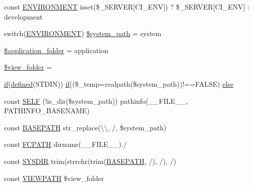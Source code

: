 \begin{DoxyCompactItemize}
\item 
const \hyperlink{index_8php_a8757a57d09df5349f8b93b2083e29a1e}{E\+N\+V\+I\+R\+O\+N\+M\+E\+N\+T} isset(\$\+\_\+\+S\+E\+R\+V\+E\+R\mbox{[}\textquotesingle{}C\+I\+\_\+\+E\+N\+V\textquotesingle{}\mbox{]}) ? \$\+\_\+\+S\+E\+R\+V\+E\+R\mbox{[}\textquotesingle{}C\+I\+\_\+\+E\+N\+V\textquotesingle{}\mbox{]} \+: \textquotesingle{}development\textquotesingle{}
\item 
switch(\hyperlink{index_8php_a8757a57d09df5349f8b93b2083e29a1e}{E\+N\+V\+I\+R\+O\+N\+M\+E\+N\+T}) \hyperlink{index_8php_af832b0c9a5014f0bb87496701ceb30e5}{\$system\+\_\+path} = \textquotesingle{}system\textquotesingle{}
\item 
\hyperlink{index_8php_ace4309eda0b92e3260b226079bc17909}{\$application\+\_\+folder} = \textquotesingle{}application\textquotesingle{}
\item 
\hyperlink{index_8php_a974fdae9fe36c7e07e82bb71ed42b6b3}{\$view\+\_\+folder} = \textquotesingle{}\textquotesingle{}
\item 
\hyperlink{excanvas_8js_a409038cddd5fb941140f7ff76f5b7b15}{if}(\hyperlink{_bootstrap_8php_a46458e8654a714e0565e20f63021add9}{defined}(\textquotesingle{}S\+T\+D\+I\+N\textquotesingle{})) \hyperlink{excanvas_8js_a409038cddd5fb941140f7ff76f5b7b15}{if}((\$\+\_\+temp=realpath(\$system\+\_\+path))!==F\+A\+L\+S\+E) \hyperlink{index_8php_afe05baa2384a370483088b4c250fcd90}{else}
\item 
const \hyperlink{index_8php_a428c045e64680e1582ba74161e441a1c}{S\+E\+L\+F} (!is\+\_\+dir(\$system\+\_\+path)) pathinfo(\+\_\+\+\_\+\+F\+I\+L\+E\+\_\+\+\_\+, P\+A\+T\+H\+I\+N\+F\+O\+\_\+\+B\+A\+S\+E\+N\+A\+M\+E)
\item 
const \hyperlink{index_8php_ad39801cabfd338dc5524466fe793fda9}{B\+A\+S\+E\+P\+A\+T\+H} str\+\_\+replace(\textquotesingle{}\textbackslash{}\textbackslash{}\textquotesingle{}, \textquotesingle{}/\textquotesingle{}, \$system\+\_\+path)
\item 
const \hyperlink{index_8php_ae486546e58b2603595efedf9f95b3926}{F\+C\+P\+A\+T\+H} dirname(\+\_\+\+\_\+\+F\+I\+L\+E\+\_\+\+\_\+).\textquotesingle{}/\textquotesingle{}
\item 
const \hyperlink{index_8php_ab645ae0961792b1f2b4b83f89cb95fa5}{S\+Y\+S\+D\+I\+R} trim(strrchr(trim(\hyperlink{index_8php_ad39801cabfd338dc5524466fe793fda9}{B\+A\+S\+E\+P\+A\+T\+H}, \textquotesingle{}/\textquotesingle{}), \textquotesingle{}/\textquotesingle{}), \textquotesingle{}/\textquotesingle{})
\item 
const \hyperlink{index_8php_ade8921d52af58583e5727833459224c3}{V\+I\+E\+W\+P\+A\+T\+H} \$view\+\_\+folder
\end{DoxyCompactItemize}


